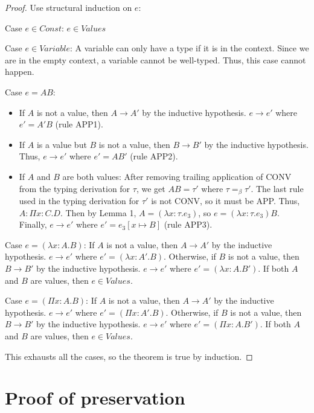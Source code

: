 \documentclass{article}
\begin{document}
\begin{proof}
  Use structural induction on $e$:
  
  Case $e\in Const$: $e\in Values$

  Case $e\in Variable$: A variable can only have a type if it is in the context. Since we are in the empty context, a variable cannot be well-typed. Thus, this case cannot happen.

  Case $e=A B$: 
  \begin{itemize}
  \item If $A$ is not a value, then $A\rightarrow A'$ by the inductive hypothesis. $e\rightarrow e'$ where $e'=A' B$ (rule APP1).
  \item If $A$ is a value but $B$ is not a value, then $B\rightarrow B'$ by the inductive hypothesis. Thus, $e\rightarrow e'$ where $e'=A B'$ (rule APP2).
  \item If $A$ and $B$ are both values: After removing trailing application of CONV from the typing derivation for $\tau$, we get $A B=\tau'$ where $\tau=_\beta \tau'$. The last rule used in the typing derivation for $\tau'$ is not CONV, so it must be APP. Thus, $A:\Pi x: C.D$. Then by Lemma 1, $A=(\lambda x:\tau.e_3)$, so $e=(\lambda x:\tau.e_3)B$. Finally, $e\rightarrow e'$ where $e'=e_3[x\mapsto B]$ (rule APP3).
  \end{itemize}
  
  Case $e=(\lambda x:A.B)$: If $A$ is not a value, then $A\rightarrow A'$ by the inductive hypothesis. $e\rightarrow e'$ where $e'=(\lambda x:A'.B)$. Otherwise, if $B$ is not a value, then $B\rightarrow B'$ by the inductive hypothesis. $e\rightarrow e'$ where $e'=(\lambda x:A.B')$. If both $A$ and $B$ are values, then $e\in Values$.
  
  Case $e=(\Pi x:A.B)$: If $A$ is not a value, then $A\rightarrow A'$ by the inductive hypothesis. $e\rightarrow e'$ where $e'=(\Pi x:A'.B)$. Otherwise, if $B$ is not a value, then $B\rightarrow B'$ by the inductive hypothesis. $e\rightarrow e'$ where $e'=(\Pi x:A.B')$. If both $A$ and $B$ are values, then $e\in Values$.

  This exhausts all the cases, so the theorem is true by induction.
  
\end{proof}

\section{Proof of preservation}
\end{document}
